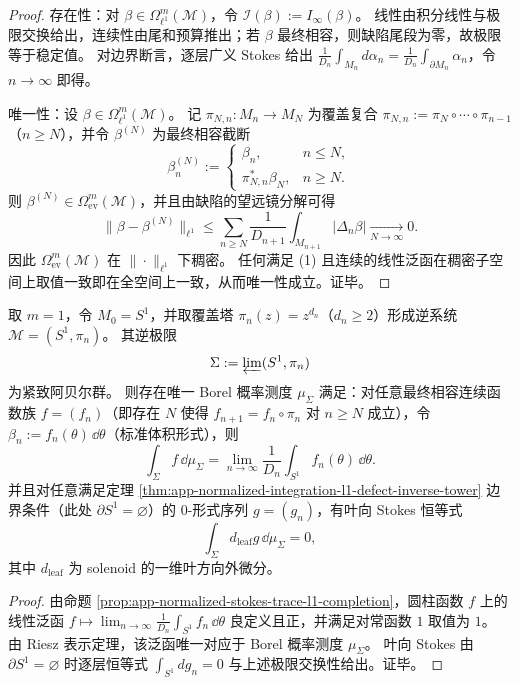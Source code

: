\begin{proof}
存在性：对 \(\beta\in\Omega^m_{\ell^1}(\mathcal M)\)，令 \(\mathcal I(\beta):=I_\infty(\beta)\)。
线性由积分线性与极限交换给出，连续性由尾和预算推出；若 \(\beta\) 最终相容，则缺陷尾段为零，故极限等于稳定值。
对边界断言，逐层广义 Stokes 给出 \(\frac{1}{D_n}\int_{M_n}d\alpha_n=\frac{1}{D_n}\int_{\partial M_n}\alpha_n\)，令 \(n\to\infty\) 即得。
\par
唯一性：设 \(\beta\in\Omega^m_{\ell^1}(\mathcal M)\)。
记 \(\pi_{N,n}:M_n\to M_N\) 为覆盖复合 \(\pi_{N,n}:=\pi_N\circ\cdots\circ\pi_{n-1}\)（\(n\ge N\)），并令 \(\beta^{(N)}\) 为最终相容截断
\[
\beta^{(N)}_n:=
\begin{cases}
\beta_n,& n\le N,\\
\pi_{N,n}^\ast\beta_N,& n\ge N.
\end{cases}
\]
则 \(\beta^{(N)}\in\Omega^m_{\mathrm{ev}}(\mathcal M)\)，并且由缺陷的望远镜分解可得
\[
\|\beta-\beta^{(N)}\|_{\ell^1}
\le
\sum_{n\ge N}\frac{1}{D_{n+1}}\int_{M_{n+1}}|\Delta_n\beta|
\xrightarrow[N\to\infty]{}0.
\]
因此 \(\Omega^m_{\mathrm{ev}}(\mathcal M)\) 在 \(\|\cdot\|_{\ell^1}\) 下稠密。
任何满足 (1) 且连续的线性泛函在稠密子空间上取值一致即在全空间上一致，从而唯一性成立。证毕。
\end{proof}

\begin{corollary}\label{cor:app-solenoid-leafwise-stokes-normalized-trace}
取 \(m=1\)，令 \(M_0=S^1\)，并取覆盖塔 \(\pi_n(z)=z^{d_n}\)（\(d_n\ge 2\)）形成逆系统 \(\mathcal M=(S^1,\pi_n)\)。
其逆极限
\[
\Sigma:=\varprojlim(S^1,\pi_n)
\]
为紧致阿贝尔群。
则存在唯一 Borel 概率测度 \(\mu_\Sigma\) 满足：对任意最终相容连续函数族 \(f=(f_n)\)（即存在 \(N\) 使得 \(f_{n+1}=f_n\circ\pi_n\) 对 \(n\ge N\) 成立），令 \(\beta_n:=f_n(\theta)\,\dd\theta\)（标准体积形式），则
\[
\int_\Sigma f\,\dd\mu_\Sigma
=
\lim_{n\to\infty}\frac{1}{D_n}\int_{S^1}f_n(\theta)\,\dd\theta.
\]
并且对任意满足定理 \ref{thm:app-normalized-integration-l1-defect-inverse-tower} 边界条件（此处 \(\partial S^1=\varnothing\)）的 \(0\)-形式序列 \(g=(g_n)\)，有叶向 Stokes 恒等式
\[
\int_\Sigma d_{\mathrm{leaf}}g\,\dd\mu_\Sigma=0,
\]
其中 \(d_{\mathrm{leaf}}\) 为 solenoid 的一维叶方向外微分。
\end{corollary}

\begin{proof}
由命题 \ref{prop:app-normalized-stokes-trace-l1-completion}，圆柱函数 \(f\) 上的线性泛函
\(
f\mapsto \lim_{n\to\infty}\frac{1}{D_n}\int_{S^1}f_n\,\dd\theta
\)
良定义且正，并满足对常函数 \(1\) 取值为 \(1\)。
由 Riesz 表示定理，该泛函唯一对应于 Borel 概率测度 \(\mu_\Sigma\)。
叶向 Stokes 由 \(\partial S^1=\varnothing\) 时逐层恒等式 \(\int_{S^1}dg_n=0\) 与上述极限交换性给出。证毕。
\end{proof}

